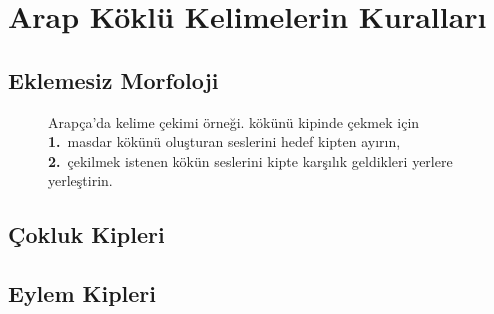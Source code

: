 
\chapter{Arap Köklü Kelimelerin Kuralları}
\section{Eklemesiz Morfoloji}

\begin{figure}[htbp]
  \centering
  
  \caption{Arapça'da kelime çekimi örneği.
    \fmtkok{\Lnun\Lvav\Lre} kökünü
     kipinde çekmek için \textbf{1.}\ masdar kökünü oluşturan \masdarkok
    seslerini hedef kipten ayırın, \textbf{2.}\ çekilmek istenen kökün seslerini
    kipte karşılık geldikleri yerlere yerleştirin.}
  \label{fig:fig2}
\end{figure}


\section{Çokluk Kipleri}

\section{Eylem Kipleri}





